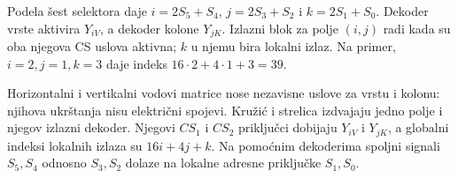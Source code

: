 Podela šest selektora daje \(i=2S_5+S_4\), \(j=2S_3+S_2\) i \(k=2S_1+S_0\).
Dekoder vrste aktivira \(Y_{iV}\), a dekoder kolone \(Y_{jK}\).
Izlazni blok za polje \((i,j)\) radi kada su oba njegova CS uslova aktivna;
\(k\) u njemu bira lokalni izlaz. Na primer, \(i=2,j=1,k=3\) daje indeks
\(16\cdot2+4\cdot1+3=39\).

Horizontalni i vertikalni vodovi matrice nose nezavisne uslove za vrstu i kolonu:
njihova ukrštanja nisu električni spojevi.
Kružić i strelica izdvajaju jedno polje i njegov izlazni dekoder.
Njegovi \(CS_1\) i \(CS_2\) priključci dobijaju \(Y_{iV}\) i \(Y_{jK}\),
a globalni indeksi lokalnih izlaza su \(16i+4j+k\).
Na pomoćnim dekoderima spoljni signali \(S_5,S_4\) odnosno \(S_3,S_2\)
dolaze na lokalne adresne priključke \(S_1,S_0\).
